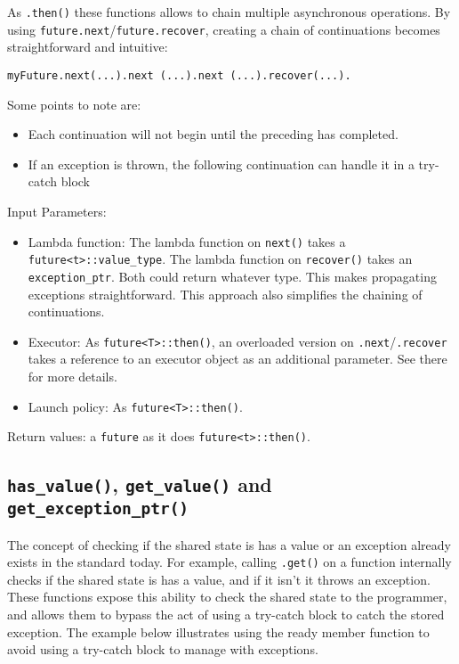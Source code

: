 \documentclass[a4paper,10pt]{article}
\newcommand{\cpp}[1]{\lstinline{#1}}
\begin{document}
 
As \cpp{.then()} these functions allows to chain multiple asynchronous operations. By using \cpp{future.next}/\cpp{future.recover}, creating a chain of continuations becomes straightforward and intuitive:
 
\begin{lstlisting}[xleftmargin=0pt]
myFuture.next(...).next (...).next (...).recover(...). 
\end{lstlisting}

Some points to note are: 

\begin{itemize}
\item Each continuation will not begin until the preceding has completed.
\item If an exception is thrown, the following continuation can handle it in a try-catch block 
\end{itemize}

Input Parameters: 

\begin{itemize}
\item Lambda function: The lambda function on \cpp{next()} takes a 
\cpp{future<t>::value_type}. The lambda function on \cpp{recover()} takes an \cpp{exception_ptr}. Both could return whatever type. This makes propagating exceptions straightforward. This approach also simplifies the chaining of continuations.
 
\item Executor: As \cpp{future<T>::then()}, an overloaded version on \cpp{.next}/\cpp{.recover} takes a reference to an executor object as an additional parameter. See there for more details.

\item Launch policy: As \cpp{future<T>::then()}. 
\end{itemize}

Return values: a \cpp{future} as it does \cpp{future<t>::then()}.

\subsection{\cpp{has_value()},  \cpp{get_value()} and \cpp{get_exception_ptr()}}

The concept of checking if the shared state is has a value or an exception already exists in the standard today. For example, calling 
\cpp{.get()} on a function internally checks if the shared state is has a value, and if it isn't it throws an exception. These functions expose this ability to check the shared state to the programmer, and allows them to bypass the act of using a try-catch block to catch the stored exception. The example below illustrates using the ready member function to avoid using a try-catch block to manage with exceptions.
\end{document}
